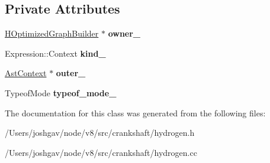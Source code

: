 \subsection*{Private Attributes}
\begin{DoxyCompactItemize}
\item 
\hyperlink{classv8_1_1internal_1_1_h_optimized_graph_builder}{H\+Optimized\+Graph\+Builder} $\ast$ {\bfseries owner\+\_\+}\hypertarget{classv8_1_1internal_1_1_ast_context_a70a8c966fff979ab14458150cdbb3669}{}\label{classv8_1_1internal_1_1_ast_context_a70a8c966fff979ab14458150cdbb3669}

\item 
Expression\+::\+Context {\bfseries kind\+\_\+}\hypertarget{classv8_1_1internal_1_1_ast_context_a39e53cdf38b266d6bfb974067c7e47d6}{}\label{classv8_1_1internal_1_1_ast_context_a39e53cdf38b266d6bfb974067c7e47d6}

\item 
\hyperlink{classv8_1_1internal_1_1_ast_context}{Ast\+Context} $\ast$ {\bfseries outer\+\_\+}\hypertarget{classv8_1_1internal_1_1_ast_context_a3dcab964b38917952ca97bb277f407d1}{}\label{classv8_1_1internal_1_1_ast_context_a3dcab964b38917952ca97bb277f407d1}

\item 
Typeof\+Mode {\bfseries typeof\+\_\+mode\+\_\+}\hypertarget{classv8_1_1internal_1_1_ast_context_a910ea33a1d0fadf7d5e8665e29c9545e}{}\label{classv8_1_1internal_1_1_ast_context_a910ea33a1d0fadf7d5e8665e29c9545e}

\end{DoxyCompactItemize}


The documentation for this class was generated from the following files\+:\begin{DoxyCompactItemize}
\item 
/\+Users/joshgav/node/v8/src/crankshaft/hydrogen.\+h\item 
/\+Users/joshgav/node/v8/src/crankshaft/hydrogen.\+cc\end{DoxyCompactItemize}
